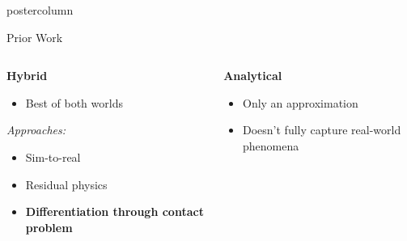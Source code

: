 \documentclass[final,hyperref={pdfpagelabels=false},5pt]{beamer}
\begin{document}
\begin{frame}
\begin{columns}
\begin{column}{.49\textwidth}
\begin{beamercolorbox}[center,wd=\textwidth]{postercolumn}
\begin{minipage}[T]{.95\textwidth}
{\begin{block}{Prior Work}
\begin{columns}[t]
                    \begin{column}{0.3\textwidth}
                        \textbf{Hybrid}
                        \begin{itemize}
                            \item Best of both worlds
                        \end{itemize}
                        \begin{center}
                            \textit{Approaches:}
                        \end{center}
                        \begin{itemize}
                            \item Sim-to-real
                            \item Residual physics
                            \item \textbf{Differentiation through contact problem}
                        \end{itemize}
                    \end{column}

                    \begin{column}{0.3\textwidth}
                        \textbf{Analytical}
                        \begin{itemize}
                            \item Only an approximation
                            \item Doesn't fully capture real-world phenomena
                        \end{itemize}
                    \end{column}
                \end{columns}
            \end{block}
            

}
\end{minipage}
\end{beamercolorbox}
\end{column}
\end{columns}
\end{frame}
\end{document}
